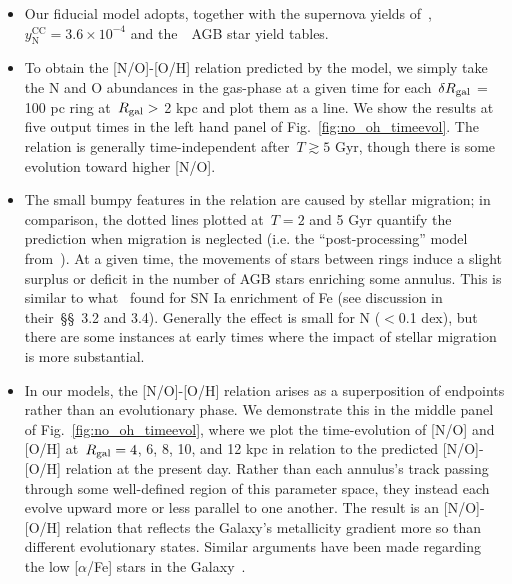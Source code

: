 \documentclass[ms.tex]{subfiles}
\begin{document}
\begin{itemize} 
	\item Our fiducial model adopts, together with the supernova yields 
	of~\citet[][see discussion in~\S~\ref{sec:methods}]{Johnson2021}, 
	$y_\text{N}^\text{CC} = 3.6\times10^{-4}$ and the~\cristallo~AGB star yield 
	tables. 

	\item To obtain the [N/O]-[O/H] relation predicted by the model, we simply 
	take the N and O abundances in the gas-phase at a given time for 
	each~$\delta R_\text{gal}$ = 100 pc ring at~$R_\text{gal} >$ 2 kpc and plot them as a 
	line.
	We show the results at five output times in the left hand panel of 
	Fig.~\ref{fig:no_oh_timeevol}. 
	The relation is generally time-independent after~$T \gtrsim 5$ Gyr, though 
	there is some evolution toward higher [N/O]. 

	\item The small bumpy features in the relation are caused by stellar 
	migration; in comparison, the dotted lines plotted at~$T = 2$ and 5 Gyr 
	quantify the prediction when migration is neglected (i.e. the 
	``post-processing'' model from~\citealt{Johnson2021}). 
	At a given time, the movements of stars between rings induce a slight 
	surplus or deficit in the number of AGB stars enriching some annulus. 
	This is similar to what~\citet{Johnson2021} found for SN Ia enrichment of 
	Fe (see discussion in their~\S\S~3.2 and 3.4). 
	Generally the effect is small for N ($<$0.1 dex), but there are some 
	instances at early times where the impact of stellar migration is more 
	substantial. \tabularnewline
	
	\item In our models, the [N/O]-[O/H] relation arises as a superposition of 
	endpoints rather than an evolutionary phase. 
	We demonstrate this in the middle panel of 
	Fig.~\ref{fig:no_oh_timeevol}, where we plot the time-evolution of 
	[N/O] and [O/H] at~$R_\text{gal} = 4$, 6, 8, 10, and 12 kpc in relation to the 
	predicted [N/O]-[O/H] relation at the present day. 
	Rather than each annulus's track passing through some well-defined region 
	of this parameter space, they instead each evolve upward more or less 
	parallel to one another. 
	The result is an [N/O]-[O/H] relation that reflects the Galaxy's 
	metallicity gradient more so than different evolutionary states. 
	Similar arguments have been made regarding the low [$\alpha$/Fe] stars in 
	the Galaxy~\citep[see, e.g.,][]{Schoenrich2009, Sharma2020}. 
\end{itemize} 
\end{document}
